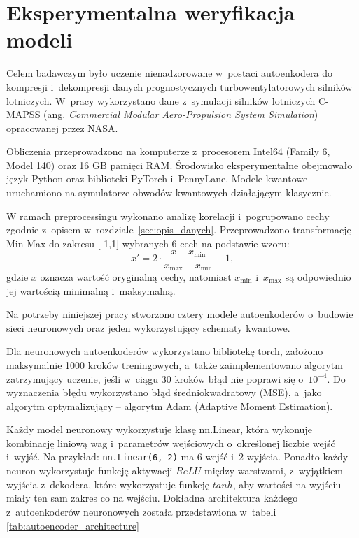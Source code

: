 \newpage
\section{Eksperymentalna weryfikacja modeli}

Celem badawczym było uczenie nienadzorowane w~postaci autoenkodera do kompresji i~dekompresji danych prognostycznych turbowentylatorowych silników lotniczych. W~pracy wykorzystano dane z~symulacji silników lotniczych C-MAPSS (ang. \textit{Commercial Modular Aero-Propulsion System Simulation}) opracowanej przez NASA.

Obliczenia przeprowadzono na komputerze z~procesorem Intel64 (Family 6, Model 140) oraz 16 GB pamięci RAM. Środowisko eksperymentalne obejmowało język Python oraz biblioteki PyTorch i~PennyLane. Modele kwantowe uruchamiono na symulatorze obwodów kwantowych działającym klasycznie.

W ramach preprocessingu wykonano analizę korelacji i~pogrupowano cechy zgodnie z~opisem w~rozdziale~\ref{sec:opis_danych}. Przeprowadzono transformację Min-Max do zakresu [-1,1] wybranych 6 cech na podstawie wzoru:
\[
x' = 2 \cdot \frac{x - x_{\min}}{x_{\max} - x_{\min}} - 1,
\]
gdzie $x$ oznacza wartość oryginalną cechy, natomiast $x_{\min}$ i~$x_{\max}$ są odpowiednio jej wartością minimalną i~maksymalną.

Na potrzeby niniejszej pracy stworzono cztery modele autoenkoderów o~budowie sieci neuronowych oraz jeden wykorzystujący schematy kwantowe.

Dla neuronowych autoenkoderów wykorzystano bibliotekę torch, założono maksymalnie 1000 kroków treningowych, a~także zaimplementowano algorytm zatrzymujący uczenie, jeśli w~ciągu 30 kroków błąd nie poprawi się o~$10^{-4}$. Do wyznaczenia błędu wykorzystano błąd średniokwadratowy (MSE), a~jako algorytm optymalizujący -- algorytm Adam (Adaptive Moment Estimation). 

Każdy model neuronowy wykorzystuje klasę nn.Linear, która wykonuje kombinację liniową wag i~parametrów wejściowych o~określonej liczbie wejść i~wyjść. Na przykład: \texttt{nn.Linear(6, 2)} ma 6 wejść i~2 wyjścia. Ponadto każdy neuron wykorzystuje funkcję aktywacji $ReLU$ między warstwami, z~wyjątkiem wyjścia z~dekodera, które wykorzystuje funkcję $tanh$, aby wartości na wyjściu miały ten sam zakres co na wejściu. Dokładna architektura każdego z~autoenkoderów neuronowych została przedstawiona w~tabeli \ref{tab:autoencoder_architecture}

